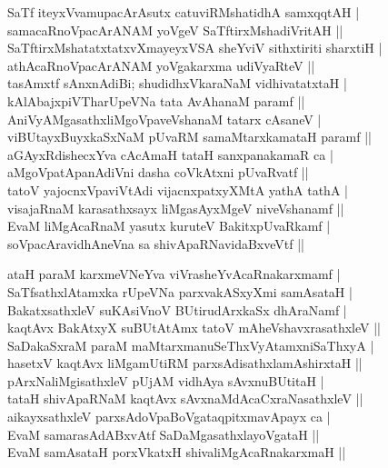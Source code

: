\begin{entry}
\begin{shl}
SaTf iteyxVvamupacArAsutx catuviRMshatidhA samxqqtAH |\\
samacaRnoVpacArANAM yoVgeV SaTftirxMshadiVritAH ||\\
SaTftirxMshatatxtatxvXmayeyxVSA sheYviV sithxtiriti sharxtiH |\\
athAcaRnoVpacArANAM yoVgakarxma udiVyaRteV ||\\
tasAmxtf sAnxnAdiBi; shudidhxVkaraNaM vidhivatatxtaH |\\
kAlAbajxpiVTharUpeVNa tata AvAhanaM paramf ||\\
AniVyAMgasathxliMgoVpaveVshanaM tatarx cAsaneV |\\
viBUtayxBuyxkaSxNaM pUvaRM samaMtarxkamataH paramf ||\\
aGAyxRdishecxYva cAcAmaH tataH sanxpanakamaR ca |\\
aMgoVpatApanAdiVni dasha coVkAtxni pUvaRvatf ||\\
tatoV yajocnxVpaviVtAdi vijacnxpatxyXMtA yathA tathA |\\
visajaRnaM karasathxsayx liMgasAyxMgeV niveVshanamf ||\\
EvaM liMgAcaRnaM yasutx kuruteV BakitxpUvaRkamf |\\
soVpacAravidhAneVna sa shivApaRNavidaBxveVtf ||
\end{shl}
\begin{shl}
ataH paraM karxmeVNeYva viVrasheYvAcaRnakarxmamf |\\
SaTfsathxlAtamxka rUpeVNa parxvakASxyXmi samAsataH |\\
BakatxsathxleV suKAsiVnoV BUtirudArxkaSx dhAraNamf |\\
kaqtAvx BakAtxyX suBUtAtAmx tatoV mAheVshavxrasathxleV ||\\
SaDakaSxraM paraM maMtarxmanuSeThxVyAtamxniSaThxyA |\\
hasetxV kaqtAvx liMgamUtiRM parxsAdisathxlamAshirxtaH ||\\
pArxNaliMgisathxleV pUjAM vidhAya sAvxnuBUtitaH |\\
tataH shivApaRNaM kaqtAvx sAvxnaMdAcaCxraNasathxleV ||\\
aikayxsathxleV parxsAdoVpaBoVgataqpitxmavApayx ca |\\
EvaM samarasAdABxvAtf SaDaMgasathxlayoVgataH ||\\
EvaM samAsataH porxVkatxH shivaliMgAcaRnakarxmaH ||
\end{shl}
\end{entry}

